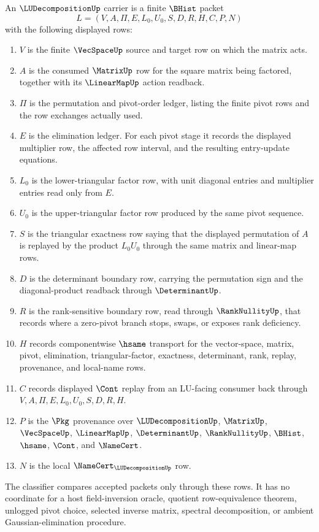\begin{definition}
\label{def:lu-decomposition-carrier}
An $\LUDecompositionUp$ carrier is a finite $\BHist$ packet
$$
L=(V,A,\Pi,E,L_0,U_0,S,D,R,H,C,P,N)
$$
with the following displayed rows:
\begin{enumerate}
\item $V$ is the finite $\VecSpaceUp$ source and target row on which the matrix acts.
\item $A$ is the consumed $\MatrixUp$ row for the square matrix being factored, together with its $\LinearMapUp$ action readback.
\item $\Pi$ is the permutation and pivot-order ledger, listing the finite pivot rows and the row exchanges actually used.
\item $E$ is the elimination ledger. For each pivot stage it records the displayed multiplier row, the affected row interval, and the resulting entry-update equations.
\item $L_0$ is the lower-triangular factor row, with unit diagonal entries and multiplier entries read only from $E$.
\item $U_0$ is the upper-triangular factor row produced by the same pivot sequence.
\item $S$ is the triangular exactness row saying that the displayed permutation of $A$ is replayed by the product $L_0U_0$ through the same matrix and linear-map rows.
\item $D$ is the determinant boundary row, carrying the permutation sign and the diagonal-product readback through $\DeterminantUp$.
\item $R$ is the rank-sensitive boundary row, read through $\RankNullityUp$, that records where a zero-pivot branch stops, swaps, or exposes rank deficiency.
\item $H$ records componentwise $\hsame$ transport for the vector-space, matrix, pivot, elimination, triangular-factor, exactness, determinant, rank, replay, provenance, and local-name rows.
\item $C$ records displayed $\Cont$ replay from an LU-facing consumer back through $V,A,\Pi,E,L_0,U_0,S,D,R,H$.
\item $P$ is the $\Pkg$ provenance over $\LUDecompositionUp$, $\MatrixUp$, $\VecSpaceUp$, $\LinearMapUp$, $\DeterminantUp$, $\RankNullityUp$, $\BHist$, $\hsame$, $\Cont$, and $\NameCert$.
\item $N$ is the local $\NameCert_{\LUDecompositionUp}$ row.
\end{enumerate}
The classifier compares accepted packets only through these rows. It has no coordinate for a host field-inversion oracle, quotient row-equivalence theorem, unlogged pivot choice, selected inverse matrix, spectral decomposition, or ambient Gaussian-elimination procedure.
\end{definition}

